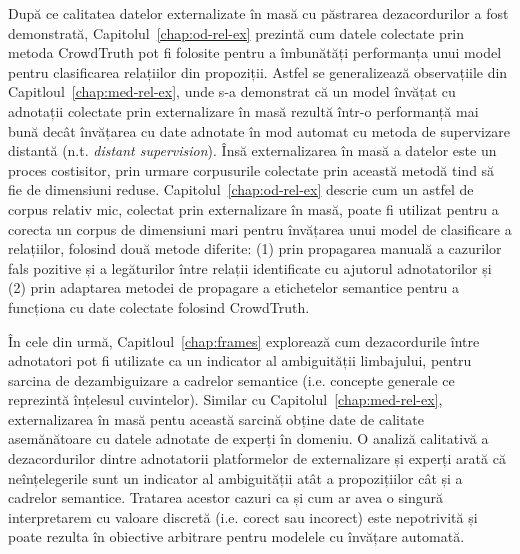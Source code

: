 După ce calitatea datelor externalizate în masă cu păstrarea dezacordurilor a fost demonstrată, Capitolul~\ref{chap:od-rel-ex} prezintă cum datele colectate prin metoda CrowdTruth pot fi folosite pentru a îmbunătăți performanța unui model pentru clasificarea relațiilor din propoziții. Astfel se generalizează observațiile din Capitloul~\ref{chap:med-rel-ex}, unde s-a demonstrat că un model învățat cu adnotații colectate prin externalizare în masă rezultă într-o performanță mai bună decât învățarea cu date adnotate în mod automat cu metoda de supervizare distantă (n.t. \textit{distant supervision}). Însă externalizarea în masă a datelor este un proces costisitor, prin urmare corpusurile colectate prin această metodă tind să fie de dimensiuni reduse. Capitolul~\ref{chap:od-rel-ex} descrie cum un astfel de corpus relativ mic, colectat prin externalizare în masă, poate fi utilizat pentru a corecta un corpus de dimensiuni mari pentru învățarea unui model de clasificare a relațiilor, folosind două metode diferite: (1) prin propagarea manuală a cazurilor fals pozitive și a legăturilor între relații identificate cu ajutorul adnotatorilor și (2) prin adaptarea metodei de propagare a etichetelor semantice pentru a funcționa cu date colectate folosind CrowdTruth.

În cele din urmă, Capitloul~\ref{chap:frames} explorează cum dezacordurile între adnotatori pot fi utilizate ca un indicator al ambiguității limbajului, pentru sarcina de dezambiguizare a cadrelor semantice (i.e. concepte generale ce reprezintă înțelesul cuvintelor). Similar cu Capitolul~\ref{chap:med-rel-ex}, externalizarea în masă pentu această sarcină obține date de calitate asemănătoare cu datele adnotate de experți în domeniu. O analiză calitativă a dezacordurilor dintre adnotatorii platformelor de externalizare și experți arată că neînțelegerile sunt un indicator al ambiguității atât a propozițiilor cât și a cadrelor semantice. Tratarea acestor cazuri ca și cum ar avea o singură interpretarem cu valoare discretă (i.e. corect sau incorect) este nepotrivită și poate rezulta în obiective arbitrare pentru modelele cu învățare automată. 





